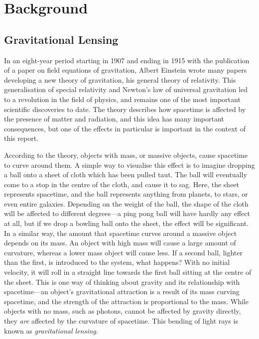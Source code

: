 \documentclass[a4paper,11pt]{article}
\begin{document}
\section{Background}
\label{sec-2}
\subsection{Gravitational Lensing}
\label{sec-2-1}

In an eight-year period starting in 1907 and ending in 1915 with the publication
of a paper on field equations of gravitation\cite{einstein1915general}, Albert
Einstein wrote many papers developing a new theory of gravitation, his general
theory of relativity. This generalisation of special relativity and Newton's law
of universal gravitation led to a revolution in the field of physics, and
remains one of the most important scientific discoveries to date. The theory
describes how spacetime is affected by the presence of matter and radiation, and
this idea has many important consequences, but one of the effects in particular
is important in the context of this report.

According to the theory, objects with mass, or massive objects, cause spacetime
to curve around them. A simple way to visualise this effect is to imagine
dropping a ball onto a sheet of cloth which has been pulled taut. The ball will
eventually come to a stop in the centre of the cloth, and cause it to sag. Here,
the sheet represents spacetime, and the ball represents anything from planets,
to stars, or even entire galaxies. Depending on the weight of the ball, the
shape of the cloth will be affected to different degrees---a ping pong ball will
have hardly any effect at all, but if we drop a bowling ball onto the sheet, the
effect will be significant. In a similar way, the amount that spacetime curves
around a massive object depends on its mass. An object with high mass will cause
a large amount of curvature, whereas a lower mass object will cause less. If a
second ball, lighter than the first, is introduced to the system, what happens?
With no initial velocity, it will roll in a straight line towards the first ball
sitting at the centre of the sheet. This is one way of thinking about gravity
and its relationship with spacetime---an object's gravitational attraction is a
result of its mass curving spacetime, and the strength of the attraction is
proportional to the mass. While objects with no mass, such as photons, cannot be
affected by gravity directly, they \emph{are} affected by the curvature of
spacetime. This bending of light rays is known as
\emph{gravitational lensing}.
\end{document}
